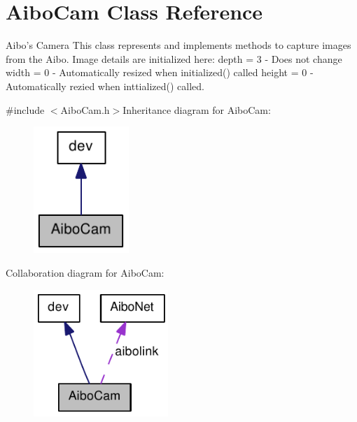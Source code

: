 \hypertarget{classAiboCam}{
\section{AiboCam Class Reference}
\label{classAiboCam}
}


Aibo's Camera This class represents and implements methods to capture images from the Aibo. Image details are initialized here: depth = 3 -\/ Does not change width = 0 -\/ Automatically resized when initialized() called height = 0 -\/ Automatically rezied when inttialized() called.  


{\ttfamily \#include $<$AiboCam.h$>$}Inheritance diagram for AiboCam:\nopagebreak
\begin{figure}[H]
\begin{center}
\leavevmode
\includegraphics[width=102pt]{classAiboCam__inherit__graph}
\end{center}
\end{figure}
Collaboration diagram for AiboCam:\nopagebreak
\begin{figure}[H]
\begin{center}
\leavevmode
\includegraphics[width=144pt]{classAiboCam__coll__graph}
\end{center}
\end{figure}
